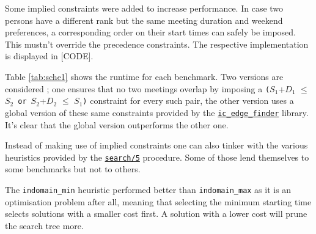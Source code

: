 Some implied constraints were added to increase performance. In case two persons have a different rank but the same meeting duration and weekend preferences, a corresponding order on their start times can safely be imposed. This mustn't override the precedence constraints. The respective implementation is displayed in [CODE].\\\par

Table \ref{tab:sche1} shows the runtime for each benchmark. Two versions are considered ; one ensures that no two meetings overlap by imposing a \texttt{(}$S_1$+$D_1$ $\leq$ $S_2$\ \texttt{or}\ $S_2$+$D_2$ $\leq$ $S_1$\texttt{)} constraint for every such pair, the other version uses a global version of these same constraints provided by the \href{http://eclipseclp.org/doc/bips/lib/ic_edge_finder/index.html}{\texttt{ic\_edge\_finder}} library. It's clear that the global version outperforms the other one.\\\par

Instead of making use of implied constraints one can also tinker with the various heuristics provided by the \href{http://eclipseclp.org/doc/bips/lib/ic/search-6.html}{\texttt{search/5}} procedure. Some of those lend themselves to some benchmarks but not to others.\par
The \texttt{indomain\_min} heuristic performed better than \texttt{indomain\_max} as it is an optimisation problem after all, meaning that selecting the minimum starting time selects solutions with a smaller cost first. A solution with a lower cost will prune the search tree more.

